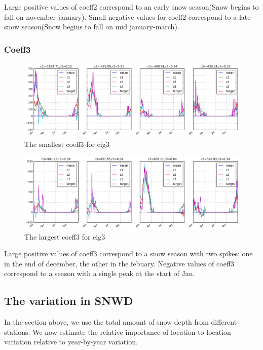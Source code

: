 \documentclass{article}
\begin{document}
Large positive values of coeff2 correspond to an early snow season(Snow begins to fall on november-january). Small negative values for coeff2 correspond to a late snow season(Snow begins to fall on mid january-march).

\subsubsection*{Coeff3}

\begin{figure}[H]
\centering
\includegraphics[width=15cm]{../figures/3_2_coeff3_smallest}
\caption{The smallest coeff3 for eig3}
\end{figure}

\begin{figure}[H]
\centering
\includegraphics[width=15cm]{../figures/3_2_coeff3_largest}
\caption{The largest coeff3 for eig3}
\end{figure}

Large positive values of coeff3 correspond to a snow season with two spikes: one in the end of december, the other in the febuary. Negative values of coeff3 correspond to a season with a single peak at the start of Jan.


\subsection*{The variation in SNWD}
In the section above, we use the total amount of snow depth from different stations. We now estimate the relative importance of location-to-location variation relative to year-by-year variation. \\
\end{document}
